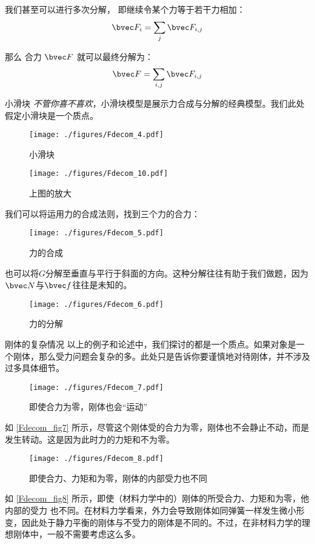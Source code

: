 我们甚至可以进行多次分解， 即继续令某个力等于若干力相加：
\begin{equation}
\bvec F_i = \sum_j \bvec F_{i,j}
\end{equation}

那么 合力 $\bvec F$ 就可以最终分解为：
\begin{equation}
\bvec F = \sum_{i,j} \bvec F_{i,j}
\end{equation}


\begin{example}{小滑块}
\textsl{不管你喜不喜欢}，小滑块模型是展示力合成与分解的经典模型。我们此处假定小滑块是一个质点。
\begin{figure}[ht]
\centering
\texttt{[image: ./figures/Fdecom\_4.pdf]}
\caption{小滑块} \label{Fdecom_fig4}
\end{figure}

\begin{figure}[ht]
\centering
\texttt{[image: ./figures/Fdecom\_10.pdf]}
\caption{上图的放大} \label{Fdecom_fig10}
\end{figure}

我们可以将运用力的合成法则，找到三个力的合力：
\begin{figure}[ht]
\centering
\texttt{[image: ./figures/Fdecom\_5.pdf]}
\caption{力的合成} \label{Fdecom_fig5}
\end{figure}

也可以将$G$分解至垂直与平行于斜面的方向。这种分解往往有助于我们做题，因为$\bvec N$与$\bvec f$往往是未知的。
\begin{figure}[ht]
\centering
\texttt{[image: ./figures/Fdecom\_6.pdf]}
\caption{力的分解} \label{Fdecom_fig6}
\end{figure}

\end{example}

\begin{example}{刚体的复杂情况}
以上的例子和论述中，我们探讨的都是一个质点。如果对象是一个刚体，那么受力问题会复杂的多。此处只是告诉你要谨慎地对待刚体，并不涉及过多具体细节。

\begin{figure}[ht]
\centering
\texttt{[image: ./figures/Fdecom\_7.pdf]}
\caption{即使合力为零，刚体也会“运动”} \label{Fdecom_fig7}
\end{figure}
如 \autoref{Fdecom_fig7} 所示，尽管这个刚体受的合力为零，刚体也不会静止不动，而是发生转动。这是因为此时力的力矩和不为零。

\begin{figure}[ht]
\centering
\texttt{[image: ./figures/Fdecom\_8.pdf]}
\caption{即使合力、力矩和为零，刚体的内部受力也不同} \label{Fdecom_fig8}
\end{figure}
如 \autoref{Fdecom_fig8}  所示，即使（材料力学中的）刚体的所受合力、力矩和为零，他内部的受力 也不同。在材料力学看来，外力会导致刚体如同弹簧一样发生微小形变，因此处于静力平衡的刚体与不受力的刚体是不同的。不过，在非材料力学的理想刚体中，一般不需要考虑这么多。
\end{example}

